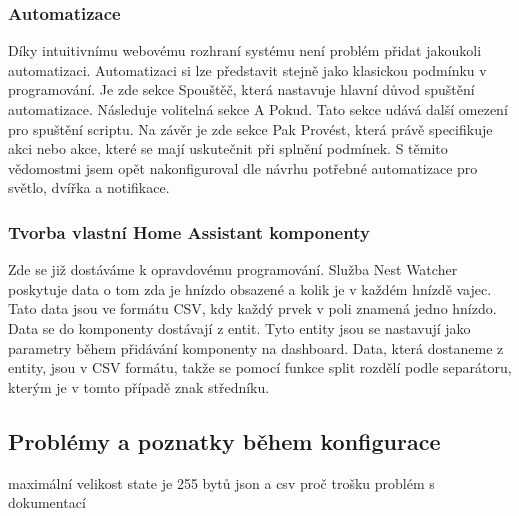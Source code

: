\subsubsection*{Automatizace}
Díky intuitivnímu webovému rozhraní systému není problém přidat jakoukoli automatizaci.
Automatizaci si lze představit stejně jako klasickou podmínku v programování.
Je zde sekce Spouštěč, která nastavuje hlavní důvod spuštění automatizace.
Následuje volitelná sekce A Pokud.
Tato sekce udává další omezení pro spuštění scriptu.
Na závěr je zde sekce Pak Provést, která právě specifikuje akci nebo akce, které se mají uskutečnit při splnění podmínek.
S těmito vědomostmi jsem opět nakonfiguroval dle návrhu potřebné automatizace pro světlo, dvířka a notifikace.


\subsubsection*{Tvorba vlastní Home Assistant komponenty}
Zde se již dostáváme k opravdovému programování.
Služba Nest Watcher poskytuje data o tom zda je hnízdo obsazené a kolik je v každém hnízdě vajec.
Tato data jsou ve formátu CSV, kdy každý prvek v poli znamená jedno hnízdo.
Data se do komponenty dostávají z entit.
Tyto entity jsou se nastavují jako parametry během přidávání komponenty na dashboard.
Data, která dostaneme z entity, jsou v CSV formátu, takže se pomocí funkce split rozdělí podle separátoru, kterým je v tomto případě znak středníku.




\subsection*{Problémy a poznatky během konfigurace}
maximální velikost state je 255 bytů
json a csv proč
trošku problém s dokumentací